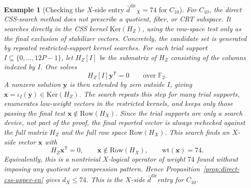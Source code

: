 \documentclass[11pt]{article}
\newcommand{\Ftwo}{\mathbb{F}_2}
\newcommand{\Ker}{\mathrm{Ker}}
\newcommand{\Row}{\mathrm{Row}}
\newcommand{\wt}{\mathrm{wt}}
\newcommand{\dbound}[1]{\ensuremath{\bar{d}^{\mathrm{#1}}}}
\newcommand{\ddir}{\dbound{dir}}
\newcommand{\markededit}[1]{#1}
\newcommand{\vect}[1]{\bm{#1}}
\newcommand{\vx}{\vect{x}}
\newcommand{\vy}{\vect{y}}
\theoremstyle{uprightthm}
\newtheorem{example}[theorem]{Example}
\begin{document}
\begin{example}[Checking the $X$-side entry $\ddir_X=74$ for $C_{10}$]
For $C_{10}$, the direct CSS-search method does not prescribe a quotient,
fiber, or CRT subspace.  It searches directly in the CSS kernel
$\Ker(H_Z)$, using the row-space test only as the final exclusion of stabilizer
vectors.  Concretely, the candidate set is generated by repeated
restricted-support kernel searches.  For each trial support
$I\subseteq\{0,\ldots,12P-1\}$, let $H_Z[I]$ be the submatrix of $H_Z$
consisting of the columns indexed by $I$.  One solves
\[
H_Z[I]\vy^{\mathsf T}=0
\qquad\text{over }\Ftwo.
\]
A nonzero solution $\vy$ is then extended by zero outside $I$, giving
$\vx=\iota_I(\vy)\in\Ker(H_Z)$.  The search repeats this step for many
trial supports, enumerates low-weight vectors in the restricted kernels, and
keeps only those passing the final test $\vx\notin\Row(H_X)$.  Since the trial
supports are only a search device, not part of the \markededit{proof}, the final
reported vector is always rechecked against the full matrix $H_Z$ and the full
row space $\Row(H_X)$.
This search finds an $X$-side vector $\vx$
with
\[
H_Z\vx^{\mathsf T}=0,\qquad
\vx\notin\Row(H_X),\qquad
\wt(\vx)=74.
\]
Equivalently, this is a nontrivial $X$-logical operator of weight $74$ found
without imposing any quotient or compression pattern.  Hence
Proposition~\ref{prop:direct-css-upper-en} gives $d_X\le 74$.
This is the $X$-side \ddir entry for $C_{10}$.
\end{example}
\end{document}
